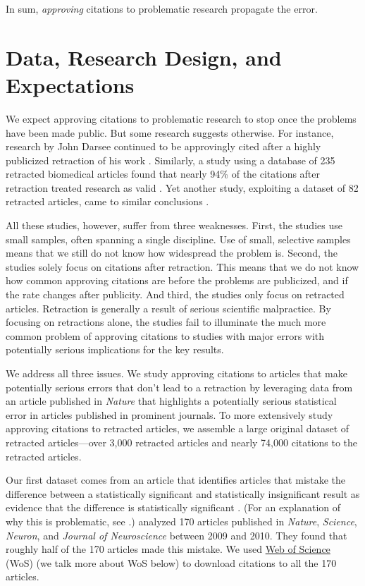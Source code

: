 \documentclass[12pt, letterpaper]{article}
\begin{document}
In sum, \textit{approving} citations to problematic research propagate the error. 

\section*{Data, Research Design, and Expectations}
We expect approving citations to problematic research to stop once the problems have been made public. But some research suggests otherwise. For instance, research by John Darsee continued to be approvingly cited after a highly publicized retraction of his work \citep{kochan1992persistence}. Similarly, a study using a database of 235 retracted biomedical articles found that nearly 94\% of the citations after retraction treated research as valid \citep{budd1998phenomena}. Yet another study, exploiting a dataset of 82 retracted articles, came to similar conclusions \citep{pfeifer1990continued}.

All these studies, however, suffer from three weaknesses. First, the studies use small samples, often spanning a single discipline. Use of small, selective samples means that we still do not know how widespread the problem is. Second, the studies solely focus on citations after retraction. This means that we do not know how common approving citations are before the problems are publicized, and if the rate changes after publicity. And third, the studies only focus on retracted articles. Retraction is generally a result of serious scientific malpractice. By focusing on retractions alone, the studies fail to illuminate the much more common problem of approving citations to studies with major errors with potentially serious implications for the key results.

We address all three issues. We study approving citations to articles that make potentially serious errors that don't lead to a retraction by leveraging data from an article published in \textit{Nature} that highlights a potentially serious statistical error in articles published in prominent journals. To more extensively study approving citations to retracted articles, we assemble a large original dataset of retracted articles---over 3,000 retracted articles and nearly 74,000 citations to the retracted articles.

Our first dataset comes from an article that identifies articles that mistake the difference between a statistically significant and statistically insignificant result as evidence that the difference is statistically significant \citep{nieuwenhuis2011}. (For an explanation of why this is problematic, see \citet{gelman2006}.) \citet{nieuwenhuis2011} analyzed 170 articles published in \textit{Nature}, \textit{Science}, \textit{Neuron}, and \textit{Journal of Neuroscience} between 2009 and 2010. They found that roughly half of the 170 articles made this mistake. We used \href{https://webofknowledge.com}{Web of Science} (WoS) (we talk more about WoS below) \citep{reuters2012web} to download citations to all the 170 articles.
\end{document}
